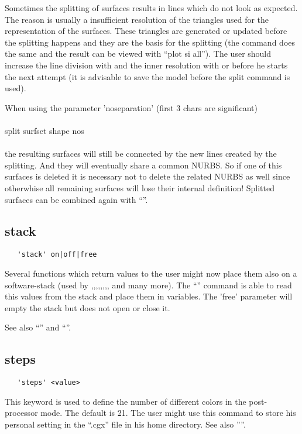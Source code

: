 \documentclass{article}
\begin{document}
Sometimes the splitting of surfaces results in lines which do not look as expected. The reason is usually a insufficient resolution of the triangles used for the representation of the surfaces. These triangles are generated or updated before the splitting happens and they are the basis for the splitting (the  command does the same and the result can be viewed with ``plot si all''). The user should increase the line division with  and the inner resolution with  or  before he starts the next attempt (it is advisable to save the model before the split command is used).

When using the parameter 'noseparation' (first 3 chars are significant)\\\\split surfset shape nos\\\\ the resulting surfaces will still be connected by the new lines created by the splitting. And they will eventually share a common NURBS. So if one of this surfaces is deleted it is necessary not to delete the related NURBS as well since otherwhise all remaining surfaces will lose their internal definition! Splitted surfaces can be combined again with ``''.


\subsection{\label{stack}stack}
\begin{verbatim}
   'stack' on|off|free
\end{verbatim}
Several functions which return values to the user might now place them also on a software-stack (used by ,,,,,,,, and many more). The ``'' command is able to read this values from the stack and place them in variables. The 'free' parameter will empty the stack but does not open or close it.

See also ``'' and ``''.

\subsection{\label{steps}steps}
\begin{verbatim}
   'steps' <value> 
\end{verbatim}
This keyword is used to define the number of different colors in the post-processor mode. The default is 21. The user might use this command to store his personal setting in the ``.cgx'' file in his home directory. See also ''''.
\end{document}
